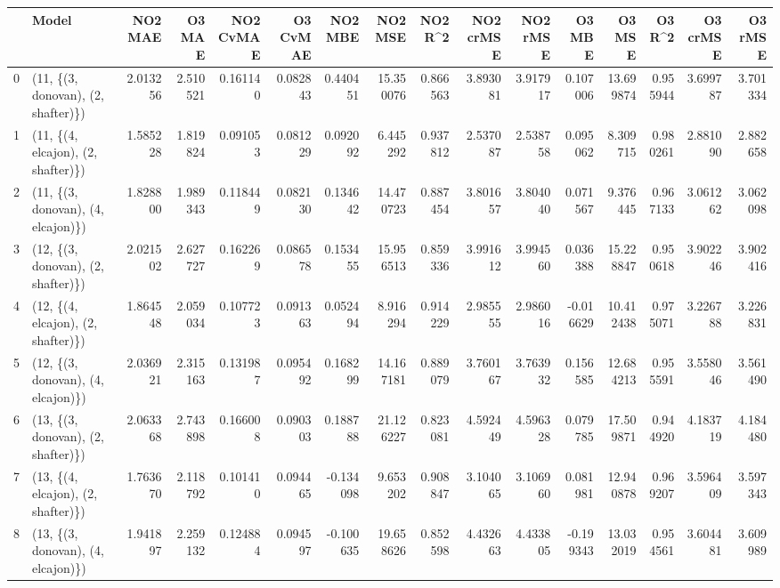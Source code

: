 \begin{tabular}{llrrrrrrrrrrrrrr}
\toprule
{} &                               Model &   NO2 MAE &    O3 MAE &  NO2 CvMAE &  O3 CvMAE &   NO2 MBE &    NO2 MSE &   NO2 R\textasciicircum2 &  NO2 crMSE &  NO2 rMSE &    O3 MBE &     O3 MSE &    O3 R\textasciicircum2 &  O3 crMSE &   O3 rMSE \\
\midrule
0  &  (11, \{(3, donovan), (2, shafter)\}) &  2.013256 &  2.510521 &   0.161140 &  0.082843 &  0.440451 &  15.350076 &  0.866563 &   3.893081 &  3.917917 &  0.107006 &  13.699874 &  0.955944 &  3.699787 &  3.701334 \\
1  &  (11, \{(4, elcajon), (2, shafter)\}) &  1.585228 &  1.819824 &   0.091053 &  0.081229 &  0.092092 &   6.445292 &  0.937812 &   2.537087 &  2.538758 &  0.095062 &   8.309715 &  0.980261 &  2.881090 &  2.882658 \\
2  &  (11, \{(3, donovan), (4, elcajon)\}) &  1.828800 &  1.989343 &   0.118449 &  0.082130 &  0.134642 &  14.470723 &  0.887454 &   3.801657 &  3.804040 &  0.071567 &   9.376445 &  0.967133 &  3.061262 &  3.062098 \\
3  &  (12, \{(3, donovan), (2, shafter)\}) &  2.021502 &  2.627727 &   0.162269 &  0.086578 &  0.153455 &  15.956513 &  0.859336 &   3.991612 &  3.994560 &  0.036388 &  15.228847 &  0.950618 &  3.902246 &  3.902416 \\
4  &  (12, \{(4, elcajon), (2, shafter)\}) &  1.864548 &  2.059034 &   0.107723 &  0.091363 &  0.052494 &   8.916294 &  0.914229 &   2.985555 &  2.986016 & -0.016629 &  10.412438 &  0.975071 &  3.226788 &  3.226831 \\
5  &  (12, \{(3, donovan), (4, elcajon)\}) &  2.036921 &  2.315163 &   0.131987 &  0.095492 &  0.168299 &  14.167181 &  0.889079 &   3.760167 &  3.763932 &  0.156585 &  12.684213 &  0.955591 &  3.558046 &  3.561490 \\
6  &  (13, \{(3, donovan), (2, shafter)\}) &  2.063368 &  2.743898 &   0.166008 &  0.090303 &  0.188788 &  21.126227 &  0.823081 &   4.592449 &  4.596328 &  0.079785 &  17.509871 &  0.944920 &  4.183719 &  4.184480 \\
7  &  (13, \{(4, elcajon), (2, shafter)\}) &  1.763670 &  2.118792 &   0.101410 &  0.094465 & -0.134098 &   9.653202 &  0.908847 &   3.104065 &  3.106960 &  0.081981 &  12.940878 &  0.969207 &  3.596409 &  3.597343 \\
8  &  (13, \{(3, donovan), (4, elcajon)\}) &  1.941897 &  2.259132 &   0.124884 &  0.094597 & -0.100635 &  19.658626 &  0.852598 &   4.432663 &  4.433805 & -0.199343 &  13.032019 &  0.954561 &  3.604481 &  3.609989 \\

\end{tabular}
